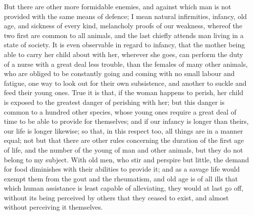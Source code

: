 \documentclass[11pt,twocolumn]{ltugboat}
\begin{document}
But there are other more formidable enemies, and against which man is
not provided with the same means of defence; I mean natural
infirmities, infancy, old age, and sickness of every kind, melancholy
proofs of our weakness, whereof the two first are common to all
animals, and the last chiefly attends man living in a state of
society. It is even observable in regard to infancy, that the mother
being able to carry her child about with her, wherever she goes, can
perform the duty of a nurse with a great deal less trouble, than the
females of many other animals, who are obliged to be constantly going
and coming with no small labour and fatigue, one way to look out for
their own subsistence, and another to suckle and feed their young
ones. True it is that, if the woman happens to perish, her child is
exposed to the greatest danger of perishing with her; but this danger
is common to a hundred other species, whose young ones require a great
deal of time to be able to provide for themselves; and if our infancy
is longer than theirs, our life is longer likewise; so that, in this
respect too, all things are in a manner equal; not but that there are
other rules concerning the duration of the first age of life, and the
number of the young of man and other animals, but they do not belong
to my subject. With old men, who stir and perspire but little, the
demand for food diminishes with their abilities to provide it; and as
a savage life would exempt them from the gout and the rheumatism, and
old age is of all ills that which human assistance is least capable of
alleviating, they would at last go off, without its being perceived by
others that they ceased to exist, and almost without perceiving it
themselves.
\end{document}
